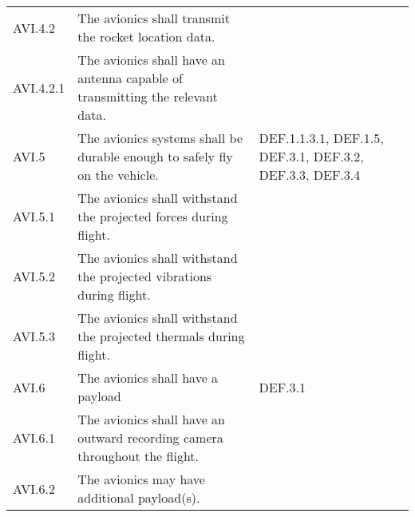 \begin{table}[htbp]
\begin{tabulary}{\textwidth}{@{}LLL@{}}
        AVI.4.2 & The avionics shall transmit the rocket location data. & \\
        AVI.4.2.1 & The avionics shall have an antenna capable of transmitting the relevant data. & \\
    \midrule
        AVI.5 & The avionics systems shall be durable enough to safely fly on the vehicle. & DEF.1.1.3.1, DEF.1.5, DEF.3.1, DEF.3.2, DEF.3.3, DEF.3.4 \\
        AVI.5.1 & The avionics shall withstand the projected forces during flight. & \\
        AVI.5.2 & The avionics shall withstand the projected vibrations during flight. & \\
        AVI.5.3 & The avionics shall withstand the projected thermals during flight. & \\
    \midrule
        AVI.6 & The avionics shall have a payload & DEF.3.1 \\
        AVI.6.1 & The avionics shall have an outward recording camera throughout the flight. & \\
        AVI.6.2 & The avionics may have additional payload(s). & \\
    \bottomrule
    \end{tabulary}

    \label{table:all-av-req}
\end{table}


